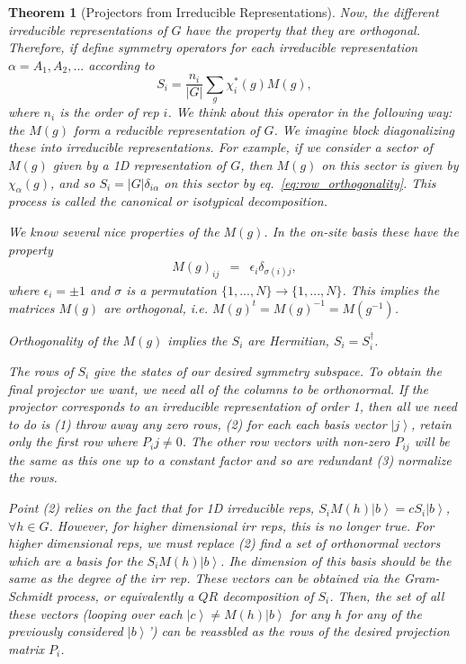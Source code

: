 \documentclass{article}
\newcommand{\ket}[1]{\left| #1 \right>} %
\newtheorem{theorem}{Theorem}[section]
\theoremstyle{definition}
\begin{document}
\begin{theorem}[Projectors from Irreducible Representations]
Now, the different irreducible representations of $G$ have the property that they are orthogonal. Therefore, if define symmetry operators for each irreducible representation $\alpha = A_1, A_2, ...$ according to
\begin{equation}
S_i =\frac{n_i}{|G|} \sum_g \chi^*_i(g) M(g),
\end{equation}
where $n_i$ is the order of rep $i$. We think about this operator in the following way: the $M(g)$ form a reducible representation of $G$. We imagine block diagonalizing these into irreducible representations. For example, if we consider a sector of $M(g)$ given by a 1D representation of $G$, then $M(g)$ on this sector is given by $\chi_\alpha(g)$, and so $S_i = |G| \delta_{i\alpha}$ on this sector by eq.~\ref{eq:row_orthogonality}. This process is called the \emph{canonical} or \emph{isotypical} decomposition.

We know several nice properties of the $M(g)$. In the on-site basis these have the property
\begin{eqnarray}
M(g)_{ij} &=& \epsilon_i \delta_{\sigma(i) j},
\end{eqnarray}
where $\epsilon_i = \pm 1$ and $\sigma$ is a permutation $\{1, ..., N\} \to \{1, ..., N\}$. This implies the matrices $M(g)$ are orthogonal, i.e. $M(g)^t = M(g)^{-1} = M(g^{-1})$.

Orthogonality of the $M(g)$ implies the $S_i$ are Hermitian, $S_i = S_i^\dag$.

The rows of $S_i$ give the states of our desired symmetry subspace. To obtain the final projector we want, we need all of the columns to be orthonormal. If the projector corresponds to an irreducible representation of order 1, then all we need to do is (1) throw away any zero rows, (2) for each each basis vector $\ket{j}$, retain only the first row where $P_ij \neq 0$. The other row vectors with non-zero $P_{ij}$ will be the same as this one up to a constant factor and so are redundant (3) normalize the rows.

Point (2) relies on the fact that for 1D irreducible reps, $S_i M(h) \ket{b} = c S_i \ket{b}$, $\forall h \in G$. However, for higher dimensional irr reps, this is no longer true. For higher dimensional reps, we must replace (2) find a set of orthonormal vectors which are a basis for the $S_i M(h) \ket{b}$. Ihe dimension of this basis should be the same as the degree of the irr rep. These vectors can be obtained via the Gram-Schmidt process, or equivalently a $QR$ decomposition of $S_i$. Then, the set of all these vectors (looping over each $\ket{c} \neq M(h) \ket{b}$ for any $h$ for any of the previously considered $\ket{b}$') can be reassbled as the rows of the desired projection matrix $P_i$.


\end{theorem}
\end{document}
